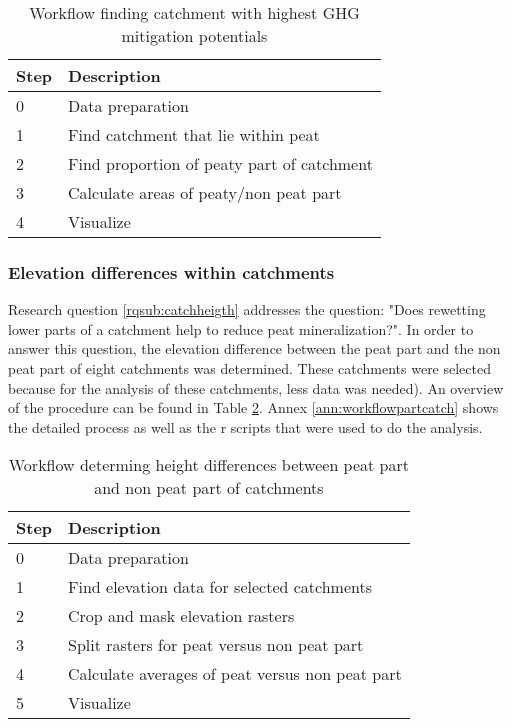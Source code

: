 \documentclass[a4paper,12pt]{scrbook}
\begin{document}
\begin{table}[htbp]
\caption{Workflow finding catchment with highest GHG mitigation potentials}
\begin{center}
\begin{tabular}{|p{3cm}|p{7cm}|}
\hline
\multicolumn{1}{|l|}{\textbf{Step}} & \textbf{Description} \\ \hline
0 & Data preparation \\ \hline
1 & Find catchment that lie within peat \\ \hline
2 & Find proportion of peaty part of catchment \\ \hline
3 & Calculate areas of peaty/non peat part \\ \hline
4 & Visualize \\ \hline
\end{tabular}
\end{center}
\label{tab:workflowwholecatch}
\end{table}

\subsubsection{Elevation differences within catchments}
Research question \ref{rqsub:catchheigth} addresses the question: "Does rewetting lower parts of a catchment help to reduce peat mineralization?". In order to answer this question, the elevation difference between the peat part and the non peat part of eight catchments was determined. These catchments were selected because for the analysis of these catchments, less data was needed). An overview of the procedure can be found in Table \ref{tab:workflowpartcatch}. Annex \ref{ann:workflowpartcatch} shows the detailed process as well as the r scripts that were used to do the analysis.

\begin{table}[htbp]
\caption{Workflow determing height differences between peat part and non peat part of catchments}
\begin{center}
\begin{tabular}{|p{3cm}|p{7cm}|}
\hline
\multicolumn{1}{|l|}{\textbf{Step}} & \textbf{Description} \\ \hline
0 & Data preparation \\ \hline
1 & Find elevation data for selected catchments \\ \hline
2 & Crop and mask elevation rasters \\ \hline
3 & Split rasters for peat versus non peat part \\ \hline
4 & Calculate averages of peat versus non peat part \\ \hline
5 & Visualize \\ \hline
\end{tabular}
\end{center}
\label{tab:workflowpartcatch}
\end{table}
\end{document}

